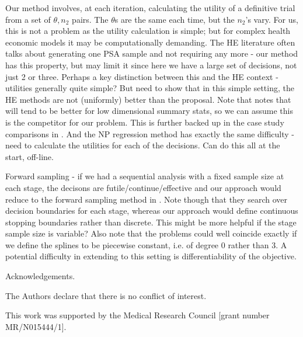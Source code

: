 \documentclass[sagev, Crown]{sagej} %
\begin{document}
Our method involves, at each iteration, calculating the utility of a definitive trial from a set of $\theta, n_2$ pairs. The $\theta$s are the same each time, but the $n_2$'s vary. For us, this is not a problem as the utility calculation is simple; but for complex health economic models it may be computationally demanding. The HE literature often talks about generating one PSA sample and not requiring any more - our method has this property, but may limit it since here we have a large set of decisions, not just 2 or three. Perhaps a key distinction between this and the HE context - utilities generally quite simple? But need to show that in this simple setting, the HE methods are not (uniformly) better than the proposal. Note that \cite{Heath2017} notes that \cite{Strong2015} will tend to be better for low dimensional summary stats, so we can assume this is the competitor for our problem. This is further backed up in the case study comparisons in \cite{Heath2020}. And the NP regression method has exactly the same difficulty - need to calculate the utilities for each of the decisions. Can do this all at the start, off-line.

Forward sampling - if we had a sequential analysis with a fixed sample size at each stage, the decisons are futile/continue/effective and our approach would reduce to the forward sampling method in \cite{Carlin1998}. Note though that they search over decision boundaries for each stage, whereas our approach would define continuous stopping boundaries rather than discrete. This might be more helpful if the stage sample size is variable? Also note that the problems could well coincide exactly if we define the splines to be piecewise constant, i.e. of degree 0 rather than 3. A potential difficulty in extending to this setting is differentiability of the objective.

\begin{acks}
Acknowledgements.
\end{acks}

\begin{dci}
The Authors declare that there is no conflict of interest.
\end{dci}

\begin{funding}
This work was supported by the Medical Research Council [grant number MR/N015444/1].
\end{funding}



\end{document}
